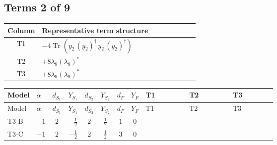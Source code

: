 \documentclass[8pt]{article}
\begin{document}
\begin{landscape}
\subsection*{Terms 2 of 9}
\begin{center}
\begin{tabular}{@{}c >{\raggedright\arraybackslash}p{0.82\linewidth}@{}}
\toprule
Column & Representative term structure \\
\midrule
T1 & \(\displaystyle -4 \operatorname{Tr}\!\left({y_2}\,\left({y_2}\right)^{\dagger}\,{y_2}\,\left({y_2}\right)^{\dagger}\right)\) \\
\midrule
T2 & \(\displaystyle +8 {\lambda_8} \left({\lambda_8}\right)^{*}\) \\
\midrule
T3 & \(\displaystyle +8 {\lambda_9} \left({\lambda_9}\right)^{*}\) \\
\midrule
\bottomrule
\end{tabular}
\end{center}
\smallskip
\tiny
\begin{longtable}{@{}llcccccc >{\raggedright\arraybackslash}p{0.21\linewidth} >{\raggedright\arraybackslash}p{0.21\linewidth} >{\raggedright\arraybackslash}p{0.21\linewidth}@{}}
\toprule
Model & $\alpha$ & $d_{S_1}$ & $Y_{S_1}$ & $d_{S_2}$ & $Y_{S_2}$ & $d_F$ & $Y_F$ & T1 & T2 & T3 \\
\midrule
\endfirsthead
\toprule
Model & $\alpha$ & $d_{S_1}$ & $Y_{S_1}$ & $d_{S_2}$ & $Y_{S_2}$ & $d_F$ & $Y_F$ & T1 & T2 & T3 \\
\midrule
\endhead
T3-B & $-1$ & $2$ & $-\frac{1}{2}$ & $2$ & $\frac{1}{2}$ & $1$ & $0$ & \scriptsize\adjustbox{max width=\linewidth}{$\begin{gathered} -4 \operatorname{Tr}\!\left({y_2}\,\left({y_2}\right)^{\dagger}\,{y_2}\,\left({y_2}\right)^{\dagger}\right)\end{gathered}$} & \scriptsize\adjustbox{max width=\linewidth}{$\begin{gathered} +8 {\lambda_8} \left({\lambda_8}\right)^{*}\end{gathered}$} & \scriptsize\adjustbox{max width=\linewidth}{$\begin{gathered} +8 {\lambda_9} \left({\lambda_9}\right)^{*}\end{gathered}$} \\
\midrule
T3-C & $-1$ & $2$ & $-\frac{1}{2}$ & $2$ & $\frac{1}{2}$ & $3$ & $0$ & \scriptsize\adjustbox{max width=\linewidth}{$\begin{gathered} -5 \operatorname{Tr}\!\left({y_2}\,\left({y_2}\right)^{\dagger}\,{y_2}\,\left({y_2}\right)^{\dagger}\right)\end{gathered}$} & \scriptsize\adjustbox{max width=\linewidth}{$\begin{gathered} +8 {\lambda_8} \left({\lambda_8}\right)^{*}\end{gathered}$} & \scriptsize\adjustbox{max width=\linewidth}{$\begin{gathered} +8 {\lambda_9} \left({\lambda_9}\right)^{*}\end{gathered}$} \\

\end{longtable}
\end{landscape}
\end{document}
